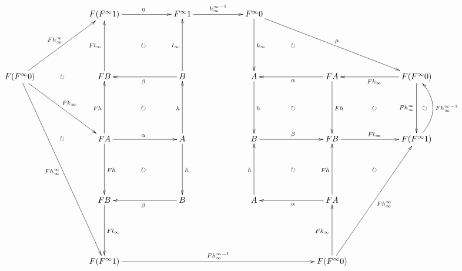 \documentclass[12pt]{article}
\begin{document}
\pagestyle{empty}

\begin{align*}
  \vcenter{
    \xymatrix@=60pt{
      &
      F (F^\infty 1)
      \ar@{->}[r]^\eta
      \ar@{{}{ }{}}[rd]|{\circlearrowright}
      &
      F^\infty 1
      \ar@{->}[r]^{{h^\infty_\infty}^{-1}}
      &
      F^\infty 0
      \ar@{->}[rrd]^\mu
      \ar@{->}[d]^{k_\infty}
      \ar@{{}{ }{}}[rd]|{\circlearrowright}
      \\
      F (F^\infty 0)
      \ar@{->}[ru]^{F h^\infty_\infty}
      \ar@{->}[rd]^{F k_\infty}
      \ar@{->}[rddd]_{F h^\infty_\infty}
      \ar@{{}{ }{}}[r]|{\circlearrowright}
      \ar@{{}{ }{}}[rdd]|{\circlearrowright}
      &
      F B
      \ar@{->}[u]^{F l_\infty}
      \ar@{{}{ }{}}[rd]|{\circlearrowright}
      &
      B
      \ar@{->}[u]^{l_\infty}
      \ar@{->}[l]^{\beta}
      &
      A
      \ar@{->}[d]^{h}
      \ar@{{}{ }{}}[rd]|{\circlearrowright}
      &
      F A
      \ar@{->}[l]^{\alpha}
      \ar@{->}[d]^{F h}
      \ar@{{}{ }{}}[rd]|{\circlearrowright}
      &
      F (F^\infty 0)
      \ar@{->}[l]^{F k_\infty}
      \ar@{->}[d]_{F h^\infty_\infty}
      \\
      &
      F A
      \ar@{->}[r]^{\alpha}
      \ar@{->}[u]^{F h}
      \ar@{->}[d]^{F h}
      \ar@{{}{ }{}}[rd]|{\circlearrowright}
      &
      A
      \ar@{->}[u]^{h}
      \ar@{->}[d]^{h}
      &
      B
      \ar@{->}[r]^{\beta}
      \ar@{{}{ }{}}[rd]|{\circlearrowright}
      &
      F B
      \ar@{->}[r]^{F l_\infty}
      &
      F (F^\infty 1)
      \ar@/_20pt/@{->}[u]_{F {h^\infty_\infty}^{-1}}
      \ar@/_10pt/@{{}{ }{}}[u]|{\circlearrowright}
      \\
      &
      F B
      \ar@{->}[d]^{F l_\infty}
      &
      B
      \ar@{->}[l]^{\beta}
      &
      A
      \ar@{->}[u]^{h}
      &
      F A
      \ar@{->}[u]^{F h}
      \ar@{->}[l]^{\alpha}
      \ar@{{}{ }{}}[ru]|{\circlearrowright}
      \\
      &
      F (F^\infty 1)
      \ar@{->}[rrr]^{F {h^\infty_\infty}^{-1}}
      & & &
      F (F^\infty 0)
      \ar@{->}[u]^{F k_\infty}
      \ar@{->}[ruu]_{F h^\infty_\infty}
    }
  }
\end{align*}
\end{document}
